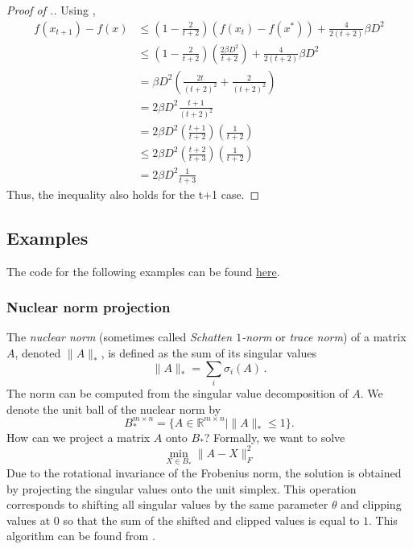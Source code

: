 \begin{proof}[Proof of .]
Using ,
\begin{align*} f(x_{t+1})-f(x) &\leq (1- \frac{2}{t+2}) (f(x_t)-f(x^*))+ \frac{4}{2(t+2)} \beta D^2 \\
& \leq (1- \frac{2}{t+2}) (\frac{2\beta D^2}{t+2})+ \frac{4}{2(t+2)} \beta D^2 \\
& = \beta D^2 (\frac{2t}{(t+2)^2} +\frac{2}{(t+2)^2}) \\
& = 2\beta D^2 \frac{t+1}{(t+2)^2} \\
& = 2\beta D^2 (\frac{t+1}{t+2}) (\frac{1}{t+2}) \\
& \leq 2\beta D^2 (\frac{t+2}{t+3}) (\frac{1}{t+2}) \\
& = 2\beta D^2 \frac{1}{t+3}
\end{align*}
Thus, the inequality also holds for the t+1 case.

\end{proof}

\subsection{Examples}
The code for the following examples can be found \href{https://ee227c.github.io/code/lecture4.html}{here}.

\subsubsection{Nuclear norm projection}
The \textit{nuclear norm} (sometimes called \textit{Schatten $1$-norm} or \textit{trace norm}) of a matrix $A$, denoted $\|A\|_*$, is defined as the sum of its singular values
\[
\|A\|_* = \sum_i \sigma_i(A)\,.
\]
The norm can be computed from the singular value decomposition of $A$.
We denote the unit ball of the nuclear norm by 
\[
B_*^{m\times n}=\{A\in\mathbb{R}^{m\times n} \mid \|A\|_*\le 1\}.
\]
How can we project a matrix $A$ onto $B_*$? Formally, we want to solve
\[
\min_{X\in B_*}\|A-X\|_F^2
\]
Due to the rotational invariance of the Frobenius norm, the solution is obtained by projecting the singular values onto the unit simplex. This operation corresponds to shifting all singular values by the same parameter $\theta$ and clipping values at $0$ so that the sum of the shifted and clipped values is equal to $1$. This algorithm can be found from \cite{Duchi2008}.

